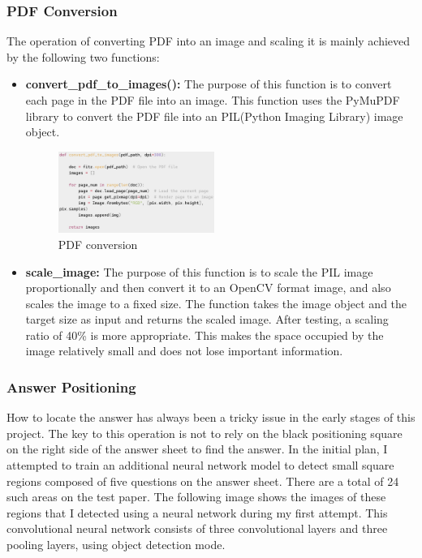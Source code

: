 \documentclass[twocolumn]{article}
\begin{document}
        \subsubsection{PDF Conversion}
        The operation of converting PDF into an image and scaling it is mainly achieved by the following two functions:
        \begin{itemize}
            \item \textbf{convert\_pdf\_to\_images():} The purpose of this function is to convert each page in the PDF file into an image. This function uses the PyMuPDF library to convert the PDF file into an PIL(Python Imaging Library) image object.
            \begin{figure}[ht]
                \centering
                \includegraphics[width=0.48\textwidth]{code1.png}
                \caption{PDF conversion}
                \label{fig:example}
            \end{figure}
            \item \textbf{scale\_image:} The purpose of this function is to scale the PIL image proportionally and then convert it to an OpenCV format image, and also scales the image to a fixed size. The function takes the image object and the target size as input and returns the scaled image. After testing, a scaling ratio of 40\% is more appropriate. This makes the space occupied by the image relatively small and does not lose important information.
        \end{itemize}
        \subsubsection{Answer Positioning}
        How to locate the answer has always been a tricky issue in the early stages of this project. The key to this operation is not to rely on the black positioning square on the right side of the answer sheet to find the answer. In the initial plan, I attempted to train an additional neural network model to detect small square regions composed of five questions on the answer sheet. There are a total of 24 such areas on the test paper. The following image shows the images of these regions that I detected using a neural network during my first attempt. This convolutional neural network consists of three convolutional layers and three pooling layers, using object detection mode.
\end{document}

